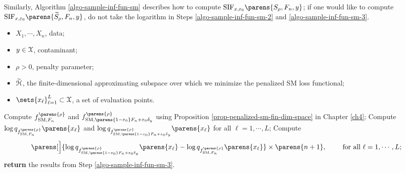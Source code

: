 Similarly, Algorithm \ref{algo-sample-inf-fun-sm} describes how to compute $\mathrm{SIF}_{x, \varepsilon_0} \parens{S_{\rho}, F_n, y}$; if one would like to compute $\mathrm{SIF}_{x, \varepsilon_0} \parens{\widetilde{S}_{\rho}, F_n, y}$, do not take the logarithm in Steps \ref{algo-sample-inf-fun-sm-2} and \ref{algo-sample-inf-fun-sm-3}. 

\begin{algorithm}
\caption{Computation of $\mathrm{SIF}_{x, \varepsilon_0} \parens{S_{\rho}, F_n, y}$}\label{algo-sample-inf-fun-sm}
\begin{algorithmic}[1]
\Statex \algorithmicrequire 
\begin{itemize}\setlength\itemsep{0em}
	\item $X_1, \cdots, X_n$, data; 
	\item $y \in \mathcal{X}$, contaminant; 
	\item $\rho > 0$, penalty parameter; 
	\item $\widetilde{\mathcal{H}}$, the finite-dimensional approximating subspace over which we minimize the penalized SM loss functional; 
	\item $\sets{x_{\ell}}_{\ell=1}^L \subset \calX$, a set of evaluation points. 
\end{itemize}

\vspace{5pt}

\State Compute $f_{\SM, F_n}^{\parens{\rho}}$ and $f_{\SM, \parens{1 - \varepsilon_0} F_n + \varepsilon_0 \delta_y}^{\parens{\rho}}$
using Proposition \ref{prop-penalized-sm-fin-dim-space} in Chapter \ref{ch4}; 
\State Compute $\log q_{f_{\SM, F_n}^{\parens{\rho}}} \parens{x_{\ell}}$ and $\log q_{f_{\SM, \parens{1 - \varepsilon_0} F_n + \varepsilon_0 \delta_y}^{\parens{\rho}}} \parens{x_{\ell}}$ for all $\ell = 1, \cdots, L$; \label{algo-sample-inf-fun-sm-2} 
\State Compute \label{algo-sample-inf-fun-sm-3}
\begin{align*}
	\parens[\Big]{\log q_{f_{\SM, \parens{1 - \varepsilon_0} F_n + \varepsilon_0 \delta_y}^{\parens{\rho}}} \parens{x_{\ell}} - \log q_{f_{\SM, F_n}^{\parens{\rho}}} \parens{x_{\ell}}} \times \parens{n+1}, \qquad \text{ for all } \ell = 1, \cdots, L; 
\end{align*}
\State \textbf{return} the results from Step \ref{algo-sample-inf-fun-sm-3}. 
\end{algorithmic}
\end{algorithm}

